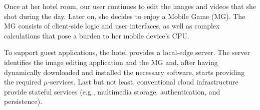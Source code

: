 
Once at her hotel room, our user continues to edit the images and videos that she shot during the day. Later on, she decides to enjoy a Mobile Game (MG). The MG consists of client-side logic and user interfaces, as well as complex calculations that pose a burden to her mobile device's CPU. 

To support guest applications, the hotel provides a local-edge server. The server identifies the image editing application and the MG and, after having dynamically downloaded and installed the necessary software, starts providing the required $\mu$-services. %
Last but not least, conventional cloud infrastructure provide stateful services (e.g., multimedia storage, authentication, and persistence).%








